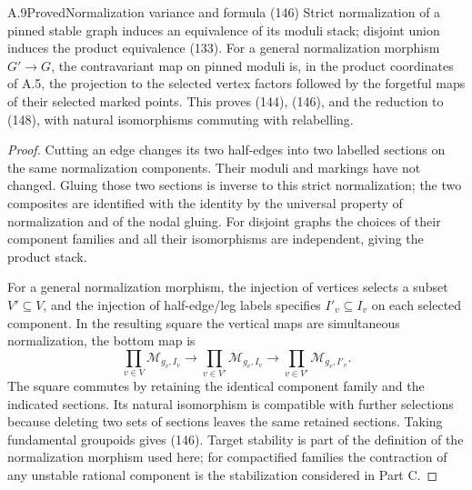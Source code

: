 \begin{result}{A.9}{Proved}{Normalization variance and formula (146)}
Strict normalization of a pinned stable graph induces an equivalence of its moduli stack; disjoint union induces the product equivalence (133). For a general normalization morphism $G'\to G$, the contravariant map on pinned moduli is, in the product coordinates of A.5, the projection to the selected vertex factors followed by the forgetful maps of their selected marked points. This proves (144), (146), and the reduction to (148), with natural isomorphisms commuting with relabelling.
\end{result}
\begin{proof}
Cutting an edge changes its two half-edges into two labelled sections on the same normalization components. Their moduli and markings have not changed. Gluing those two sections is inverse to this strict normalization; the two composites are identified with the identity by the universal property of normalization and of the nodal gluing. For disjoint graphs the choices of their component families and all their isomorphisms are independent, giving the product stack.

For a general normalization morphism, the injection of vertices selects a subset $V'\subseteq V$, and the injection of half-edge/leg labels specifies $I'_v\subseteq I_v$ on each selected component. In the resulting square the vertical maps are simultaneous normalization, the bottom map is
\[
 \prod_{v\in V}\mathcal M_{g_v,I_v}
 \longrightarrow\prod_{v\in V'}\mathcal M_{g_v,I_v}
 \longrightarrow\prod_{v\in V'}\mathcal M_{g_v,I'_v}.
\]
The square commutes by retaining the identical component family and the indicated sections. Its natural isomorphism is compatible with further selections because deleting two sets of sections leaves the same retained sections. Taking fundamental groupoids gives (146). Target stability is part of the definition of the normalization morphism used here; for compactified families the contraction of any unstable rational component is the stabilization considered in Part C.
\end{proof}

